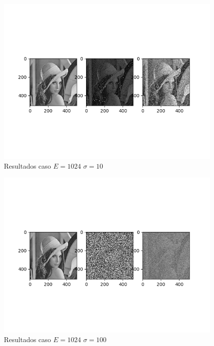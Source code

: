 \begin{figure}
\includegraphics[scale=0.9]{Imagenes/E1024S10}
\centering
\caption{Resultados caso $E=1024$ $\sigma = 10$ }
\end{figure}

\begin{figure}
\includegraphics[scale=0.9]{Imagenes/E1024S100}
\centering
\caption{Resultados caso $E=1024$ $\sigma = 100$ }
\end{figure}



